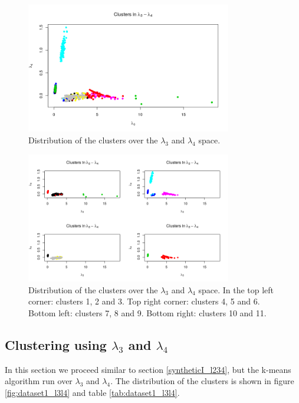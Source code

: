 \begin{figure}[H]
    \centering
    \includegraphics[width=0.8\textwidth]{img/gld_clustering/Dataset1/l2_l3_l4/intento_3/l3_l4.png}
    \caption{Distribution of the clusters over the $\lambda_{3}$ and $\lambda_{4}$ space.}
    \label{fig:dataset1_l2l3l4_l3_l4}
\end{figure}

\begin{figure}[H]
    \centering
    \includegraphics[width=0.8\textwidth]{img/gld_clustering/Dataset1/l2_l3_l4/intento_3/l3_l4_dividido.png}
    \caption{Distribution of the clusters over the $\lambda_{3}$ and $\lambda_{4}$ space. In the top left corner: clusters 1, 2 and 3. Top right corner: clusters 4, 5 and 6. Bottom left: clusters 7, 8 and 9. Bottom right: clusters 10 and 11.}
    \label{fig:dataset1_l2l3l4_l3_l4_dividido}
\end{figure}

\subsection{Clustering using $\lambda_{3}$ and $\lambda_{4}$}\label{syntheticI_l34}

In this section we proceed similar to section \ref{syntheticI_l234}, but the k-means algorithm run over $\lambda_{3}$ and $\lambda_{4}$. The distribution of the clusters is shown in figure \ref{fig:dataset1_l3l4} and table \ref{tab:dataset1_l3l4}.

